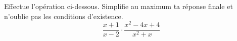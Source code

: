 %
%
    Effectue l'opération ci-dessous. Simplifie au maximum ta réponse finale et n'oublie pas les conditions d'existence.
    \[\dfrac{x+1}{x-2}\cdot\dfrac{x^2-4x+4}{x^2 + x}\]
